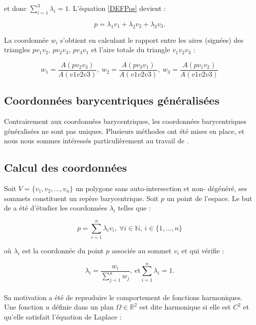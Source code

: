 et donc $\sum_{i=1}^3 \lambda_i = 1$. L'équation \ref{DEFPos} devient :

\begin{equation}
  p = \lambda_1 v_1 + \lambda_2 v_2 + \lambda_3 v_3.
\end{equation}

La coordonnée $w_i$ s'obtient en calculant le rapport entre les aires
(signées) des triangles $pv_1v_2$, $pv_2v_3$, $pv_3v_1$ et l'aire totale du
triangle $v_1v_2v_3$ :

\begin{equation}
  w_1 = \frac{A(pv_2v_3)}{A(v1v2v3)},~  w_2 = \frac{A(pv_3v_1)}{A(v1v2v3)},~  w_3 = \frac{A(pv_1v_2)}{A(v1v2v3)}
\end{equation}

\subsection{Coordonnées barycentriques généralisées}

Contrairement aux coordonnées barycentriques, les coordonnées barycentriques
généralisées ne sont pas uniques. Plusieurs méthodes ont été mises en place,
et nous nous sommes intéressés particulièrement au travail de \cite{Flo03}.

\subsection{Calcul des coordonnées}

Soit $V = \{v_1, v_2, ..., v_n\}$ un polygone sans auto-intersection et non-
dégénéré, ses sommets constituent un repère barycentrique. Soit $p$ un point
de l'espace. Le but de \cite{Flo03} a été d'étudier les coordonnées
$\lambda_i$ telles que :

\begin{equation}
  p = \sum_{i=1}^{n} \lambda_i v_i ,
  ~ \forall i \in \mathbb{N} ,~ i \in \{1,\text{...}, n\}
\end{equation}

où $\lambda_i$ est la coordonnée du point $p$ associée au sommet $v_i$ et qui
vérifie :

\begin{equation}
  \lambda_i = \frac{w_i}{\sum_{j=1}^n w_j},~ \text{et} \sum_{i=1}^n \lambda_i = 1.
\end{equation}
\\

Sa motivation a été de reproduire le comportement de fonctions harmoniques.
Une fonction $u$ définie dans un plan $\Omega \in \mathbb{R}^2$ est dite
harmonique si elle est $C^2$ et qu'elle satisfait l'équation de Laplace :


